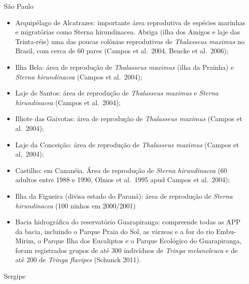 \documentclass[
]{scrbook}
\begin{document}
São Paulo

\begin{itemize}
\item
  Arquipélago de Alcatrazes: importante área reprodutiva de espécies marinhas e migratórias como Sterna hirundinacea. Abriga (ilha dos Amigos e laje das Trinta-réis) uma das poucas colônias reprodutivas de \emph{Thalasseus maximus} no Brasil, com cerca de 60 pares (Campos et al.~2004, Bencke et al.~2006);
\item
  Ilha Bela: área de reprodução de \emph{Thalasseus maximus} (ilha da Prainha) e \emph{Sterna hirundinacea} (Campos et al.~2004);
\item
  Laje de Santos: área de reprodução de \emph{Thalasseus maximus} e \emph{Sterna hirundinacea} (Campos et al.~2004);
\item
  Ilhote das Gaivotas: área de reprodução de \emph{Thalasseus maximus} (Campos et al.~2004);
\item
  Laje da Conceição: área de reprodução de \emph{Thalasseus maximus} (Campos et al.~2004);
\item
  Castilho: em Cananéia. Área de reprodução de \emph{Sterna hirundinacea} (60 adultos entre 1988 e 1990, Olmos et al.~1995 apud Campos et al.~2004);
\item
  Ilha da Figueira (divisa estado do Paraná): área de reprodução de \emph{Sterna hirundinacea} (100 ninhos em 2000/2001)
\item
  Bacia hidrográfica do reservatório Guarapiranga: compreende todas as APP da bacia, incluindo o Parque Praia do Sol, as várzeas e a foz do rio Embu-Mirim, o Parque Ilha dos Eucaliptos e o Parque Ecológico do Guarapiranga, foram registrados grupos de até 300 indivíduos de \emph{Tringa melanoleuca} e de até 200 de \emph{Tringa flavipes} (Schunck 2011).
\end{itemize}

Sergipe
\end{document}
